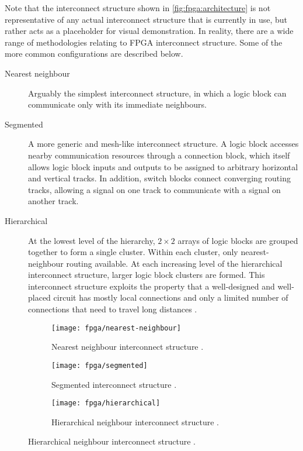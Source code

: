 Note that the interconnect structure shown in \autoref{fig:fpga:architecture} is
not representative of any actual interconnect structure that is currently in
use, but rather acts as a placeholder for visual demonstration. In reality,
there are a wide range of methodologies relating to \gls{FPGA} interconnect
structure. Some of the more common configurations are described below.
\begin{description}
    \item[Nearest neighbour] Arguably the simplest interconnect structure, in
        which a logic block can communicate only with its immediate neighbours.
    \item[Segmented] A more generic and mesh-like interconnect structure. A
        logic block accesses nearby communication resources through a connection
        block, which itself allows logic block inputs and outputs to be assigned
        to arbitrary horizontal and vertical tracks. In addition, switch blocks
        connect converging routing tracks, allowing a signal on one track to
        communicate with a signal on another track.
    \item[Hierarchical] At the lowest level of the hierarchy, $2 \times 2$
        arrays of logic blocks are grouped together to form a single cluster.
        Within each cluster, only nearest-neighbour routing available. At each
        increasing level of the hierarchical interconnect structure, larger
        logic block clusters are formed. This interconnect structure exploits
        the property that a well-designed and well-placed circuit has mostly
        local connections and only a limited number of connections that need to
        travel long distances \cite{Hauck:2007}.
\end{description}

\begin{figure}
    \caption{\gls{FPGA} interconnect structures.}
    \label{fig:fpga:interconnect}
    
    \centering
    \begin{subfigure}[b]{0.3\textwidth}
        \centering
        \texttt{[image: fpga/nearest-neighbour]}
        \caption[Nearest neighbour interconnect structure.]
            {Nearest neighbour interconnect structure \cite{Hauck:2007}.}
        \label{fig:fpga:interconnect:nearestNeighbour}
    \end{subfigure}
    \quad
    \begin{subfigure}[b]{0.3\textwidth}
        \centering
        \texttt{[image: fpga/segmented]}
        \caption[Segmented interconnect structure.]
            {Segmented interconnect structure \cite{Hauck:2007}.}
        \label{fig:fpga:interconnect:segmented}
    \end{subfigure}
    \quad
    \begin{subfigure}[b]{0.3\textwidth}
        \centering
        \texttt{[image: fpga/hierarchical]}
        \caption[Hierarchical neighbour interconnect structure.]
            {Hierarchical neighbour interconnect structure \cite{Hauck:2007}.}
        \label{fig:fpga:interconnect:hierarchical}
    \end{subfigure}
\end{figure}

